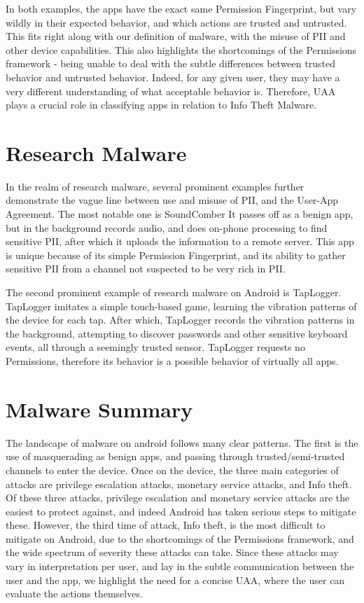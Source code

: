 In both examples, the apps have the exact same Permission Fingerprint, but vary wildly in their expected behavior, and which actions are trusted and untrusted. This fits right along with our definition of malware, with the misuse of PII and other device capabilities. This also highlights the shortcomings of the Permissions framework - being unable to deal with the subtle differences between trusted behavior and untrusted behavior. Indeed, for any given user, they may have a very different understanding of what acceptable behavior is. Therefore, UAA plays a crucial role in classifying apps in relation to Info Theft Malware.

\section{Research Malware}
In the realm of research malware, several prominent examples further demonstrate the vague line between use and misuse of PII, and the User-App Agreement. The most notable one is SoundComber\citep{schlegel2011soundcomber} It passes off as a benign app, but in the background records audio, and does on-phone processing to find sensitive PII, after which it uploads the information to a remote server. This app is unique because of its simple Permission Fingerprint, and its ability to gather sensitive PII from a channel not suspected to be very rich in PII.

The second prominent example of research malware on Android is TapLogger\citep{xu2012taplogger}. TapLogger imitates a simple touch-based game, learning the vibration patterns of the device for each tap. After which, TapLogger records the vibration patterns in the background, attempting to discover passwords and other sensitive keyboard events, all through a seemingly trusted sensor. TapLogger requests no Permissions, therefore its behavior is a possible behavior of virtually all apps. 

\section{Malware Summary}
The landscape of malware on android follows many clear patterns. The first is the use of masquerading as benign apps, and passing through trusted/semi-trusted channels to enter the device. Once on the device, the three main categories of attacks are privilege escalation attacks, monetary service attacks, and Info theft. Of these three attacks, privilege escalation and monetary service attacks are the easiest to protect against, and indeed Android has taken serious steps to mitigate these. However, the third time of attack, Info theft, is the most difficult to mitigate on Android, due to the shortcomings of the Permissions framework, and the wide spectrum of severity these attacks can take. Since these attacks may vary in interpretation per user, and lay in the subtle communication between the user and the app, we highlight the need for a concise UAA, where the user can evaluate the actions themselves.
